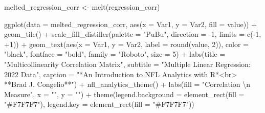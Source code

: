 \documentclass[
  letterpaper,
]{krantz}
\newenvironment{Shaded}{\begin{snugshade}}{\end{snugshade}}
\newcommand{\AttributeTok}[1]{\textcolor[rgb]{0.40,0.45,0.13}{#1}}
\newcommand{\DecValTok}[1]{\textcolor[rgb]{0.68,0.00,0.00}{#1}}
\newcommand{\FunctionTok}[1]{\textcolor[rgb]{0.28,0.35,0.67}{#1}}
\newcommand{\NormalTok}[1]{\textcolor[rgb]{0.00,0.23,0.31}{#1}}
\newcommand{\OtherTok}[1]{\textcolor[rgb]{0.00,0.23,0.31}{#1}}
\newcommand{\SpecialCharTok}[1]{\textcolor[rgb]{0.37,0.37,0.37}{#1}}
\newcommand{\StringTok}[1]{\textcolor[rgb]{0.13,0.47,0.30}{#1}}
\begin{document}
\begin{tcolorbox}
\begin{Shaded}
\begin{Highlighting}[]
\NormalTok{melted\_regression\_corr }\OtherTok{\textless{}{-}} \FunctionTok{melt}\NormalTok{(regression\_corr)}

\FunctionTok{ggplot}\NormalTok{(}\AttributeTok{data =}\NormalTok{ melted\_regression\_corr, }\FunctionTok{aes}\NormalTok{(}\AttributeTok{x =}\NormalTok{ Var1,}
                                          \AttributeTok{y =}\NormalTok{ Var2,}
                                          \AttributeTok{fill =}\NormalTok{ value)) }\SpecialCharTok{+}
  \FunctionTok{geom\_tile}\NormalTok{() }\SpecialCharTok{+}
  \FunctionTok{scale\_fill\_distiller}\NormalTok{(}\AttributeTok{palette =} \StringTok{"PuBu"}\NormalTok{,}
                       \AttributeTok{direction =} \SpecialCharTok{{-}}\DecValTok{1}\NormalTok{,}
                       \AttributeTok{limits =} \FunctionTok{c}\NormalTok{(}\SpecialCharTok{{-}}\DecValTok{1}\NormalTok{, }\SpecialCharTok{+}\DecValTok{1}\NormalTok{)) }\SpecialCharTok{+}
  \FunctionTok{geom\_text}\NormalTok{(}\FunctionTok{aes}\NormalTok{(}\AttributeTok{x =}\NormalTok{ Var1, }\AttributeTok{y =}\NormalTok{ Var2, }\AttributeTok{label =} \FunctionTok{round}\NormalTok{(value, }\DecValTok{2}\NormalTok{)),}
            \AttributeTok{color =} \StringTok{"black"}\NormalTok{,}
            \AttributeTok{fontface =} \StringTok{"bold"}\NormalTok{,}
            \AttributeTok{family =} \StringTok{"Roboto"}\NormalTok{, }\AttributeTok{size =} \DecValTok{5}\NormalTok{) }\SpecialCharTok{+}
  \FunctionTok{labs}\NormalTok{(}\AttributeTok{title =} \StringTok{"Multicollinearity Correlation Matrix"}\NormalTok{,}
       \AttributeTok{subtitle =} \StringTok{"Multiple Linear Regression: 2022 Data"}\NormalTok{,}
       \AttributeTok{caption =} \StringTok{"*An Introduction to NFL Analytics with R*\textless{}br\textgreater{}}
\StringTok{       **Brad J. Congelio**"}\NormalTok{) }\SpecialCharTok{+}
  \FunctionTok{nfl\_analytics\_theme}\NormalTok{() }\SpecialCharTok{+}
  \FunctionTok{labs}\NormalTok{(}\AttributeTok{fill =} \StringTok{"Correlation }\SpecialCharTok{\textbackslash{}n}\StringTok{ Measure"}\NormalTok{, }\AttributeTok{x =} \StringTok{""}\NormalTok{, }\AttributeTok{y =} \StringTok{""}\NormalTok{) }\SpecialCharTok{+}
  \FunctionTok{theme}\NormalTok{(}\AttributeTok{legend.background =} \FunctionTok{element\_rect}\NormalTok{(}\AttributeTok{fill =} \StringTok{"\#F7F7F7"}\NormalTok{),}
        \AttributeTok{legend.key =} \FunctionTok{element\_rect}\NormalTok{(}\AttributeTok{fill =} \StringTok{"\#F7F7F7"}\NormalTok{))}
\end{Highlighting}
\end{Shaded}


\end{tcolorbox}
\end{document}
